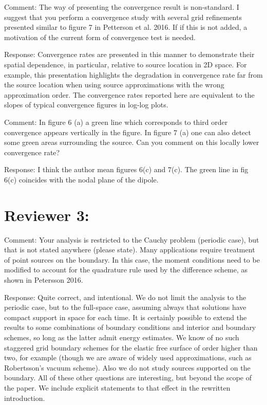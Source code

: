 Comment: The way of presenting the convergence result is non-standard. I suggest that you perform a convergence study with several grid refinements presented similar to figure 7 in Petterson et al. 2016. If if this is not added, a motivation of the current form of convergence test is needed.

Response: Convergence rates are presented in this manner to demonstrate their spatial dependence, in particular, relative to source location in 2D space. For example, this presentation highlights the degradation in convergence rate far from the source location when using source approximations with the wrong approximation order. The convergence rates reported here are equivalent to the slopes of typical convergence figures in log-log plots.

Comment: In figure 6 (a) a green line which corresponds to third order convergence appears vertically in the figure. In figure 7 (a) one can also detect some green areas surrounding the source. Can you comment on this locally lower convergence rate?

Response: I think the author mean figures 6(c) and 7(c). The green line in fig 6(c) coincides with the nodal plane of the dipole. 


\section{Reviewer 3:} 

Comment: Your analysis is restricted to the Cauchy problem (periodic case), but that is not stated anywhere (please state).  Many applications require treatment of point sources on the boundary. In this case, the moment conditions need to be modified to account for the quadrature rule used by the difference scheme, as shown in Petersson 2016.  

Response: Quite correct, and intentional. We do not limit the analysis to the periodic case, but to the full-space case, assuming always that solutions have compact support in space for each time.  It is certainly possible to extend the results to some combinations of boundary conditions and interior and boundary schemes, so long as the latter admit energy estimates. We know of no such staggered grid boundary schemes for the elastic free surface of order higher than two, for example (though we are aware of widely used approximations, such as Robertsson's vacuum scheme). Also we do not study sources supported on the boundary. All of these other questions are interesting, but beyond the scope of the paper. We include explicit statements to that effect in the rewritten introduction.

